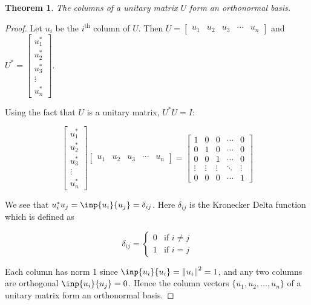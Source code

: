 \documentclass[twoside]{article}
\newcommand*\adj[1]{#1^*}
\newcommand*\norm[1]{\left \Vert #1 \right\Vert}
\theoremstyle{plain}
\newtheorem{theorem}{Theorem}
\theoremstyle{definition}
\theoremstyle{remark}
\begin{document}
\begin{theorem} The columns of a unitary matrix \(U\) form an orthonormal basis. \end{theorem}
\begin{proof}  Let \(u_i\) be the \(i^\text{th}\) column of \(U\). Then \(U = \begin{bmatrix} u_1 & u_2 & u_3 & \cdots & u_n \end{bmatrix}\) and \(\adj{U} = \begin{bmatrix} \adj{u_1} \\ \adj{u_2} \\ \adj{u_3} \\ \vdots \\ \adj{u_n} \end{bmatrix} \). 

Using the fact that \(U\) is a unitary matrix, \(\adj{U} U = I\):

\[  \begin{bmatrix} \adj{u_1} \\ \adj{u_2} \\ \adj{u_3} \\ \vdots \\ \adj{u_n} \end{bmatrix} \begin{bmatrix} u_1 & u_2 & u_3 & \cdots & u_n \end{bmatrix} = \begin{bmatrix} 1 & 0 & 0 & \cdots & 0 \\
0 & 1 & 0 & \cdots & 0 \\
0 & 0 & 1 & \cdots & 0 \\
\vdots & \vdots & \vdots & \ddots & \vdots \\
0 & 0 & 0 & \cdots & 1\end{bmatrix}\]

We see that \(\adj{u_i} u_j = \inp{u_i}{u_j} = \delta_{ij}\). Here \(\delta_{ij}\) is the Kronecker Delta function which is defined as

\[\delta_{ij} = \begin{cases} 
0 & \text{if } i \ne j \\
1 & \text{if } i = j \end{cases}
 \]


Each column has norm 1 since \(\inp{u_i}{u_i}= \norm{u_i}^2  =1\), and any two columns are orthogonal \(\inp{u_i}{u_j} = 0\). Hence the column vectors \(\{u_1, u_2, \ldots , u_n\}\) of a unitary matrix form an orthonormal basis.
    \end{proof}
\end{document}

